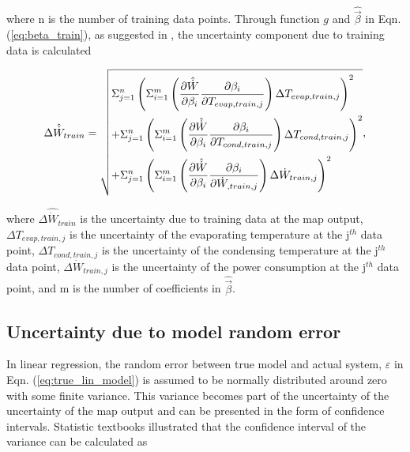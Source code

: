 where n is the number of training data points. Through function $g$ and $\hat{ \vec {\beta}}$ in Eqn. (\ref{eq:beta_train}), as suggested in \cite{song:2013}, the uncertainty component due to training data is calculated

\begin{equation}
\Delta {\hat{\dot{W}}_{train}} = \sqrt{\begin{gathered}
  \Sigma_{j=1}^n\left(\Sigma _{i = 1}^m\left(\frac{{\partial \hat{\dot{W}}}}{{\partial {\beta _i}}}\frac{{\partial {\beta _i}}}{{\partial {T_{evap,train,j}}}}\right)\Delta {T_{evap,train,j}}\right)^2  \hfill \\
  +\Sigma_{j=1}^n\left(\Sigma _{i = 1}^m\left(\frac{{\partial \hat{\dot{W}}}}{{\partial {\beta _i}}}\frac{{\partial {\beta _i}}}{{\partial {T_{cond,train,j}}}}\right)\Delta {T_{cond,train,j}}\right)^2 \hfill \\
   +\Sigma_{j=1}^n\left(\Sigma _{i = 1}^m\left(\frac{{\partial \hat{\dot{W}}}}{{\partial {\beta _i}}}\frac{{\partial {\beta _i}}}{{\partial {\dot{W}_{,train,j}}}}\right)\Delta {\dot{W}_{train,j}}\right)^2 \hfill \\ 
\end{gathered}}, 
\label{eq:uncer_w_train}
\end{equation}


where $\Delta {\hat{\dot{W}}_{train}}$ is the uncertainty due to training data at the map output, $\Delta {T_{evap,train,j}}$ is the uncertainty of the evaporating temperature at the j$^{th}$ data point, $\Delta {T_{cond,train,j}}$ is the uncertainty of the condensing temperature at the j$^{th}$ data point, $\Delta {\dot{W}_{train,j}}$ is the uncertainty of the power consumption at the j$^{th}$ data point, and m is the number of coefficients in $\hat{\vec{\beta}}$.

\subsection{Uncertainty due to model random error} \label{subsec:uncer_model}

In linear regression, the random error between true model and actual system, $\varepsilon$ in Eqn. (\ref{eq:true_lin_model}) is assumed to be normally distributed around zero with some finite variance. This variance becomes part of the uncertainty of the uncertainty of the map output and can be presented in the form of confidence intervals. Statistic textbooks \cite{Montgomery:2005,Graybill:1994} illustrated that the confidence interval of the variance can be calculated as


